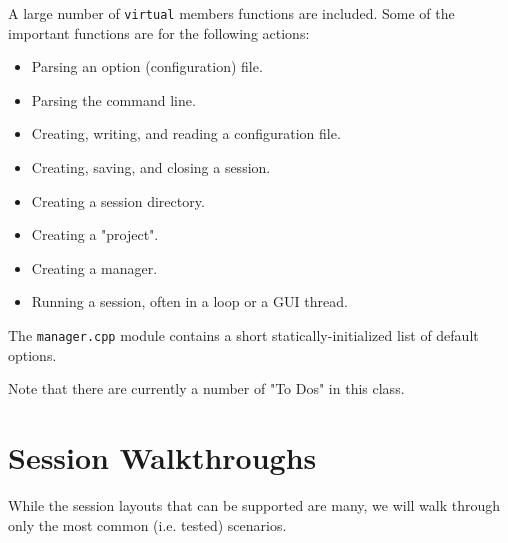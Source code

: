    A large number of \texttt{virtual} members functions are included.
   Some of the important functions are for the following actions:

   \begin{itemize}
      \item Parsing an option (configuration) file.
      \item Parsing the command line.
      \item Creating, writing, and reading a configuration file.
      \item Creating, saving, and closing a session.
      \item Creating a session directory.
      \item Creating a "project".
      \item Creating a manager.
      \item Running a session, often in a loop or a GUI thread.
   \end{itemize}
   
   The \texttt{manager.cpp} module contains a short
   statically-initialized list of
   default options.

   Note that there are currently a number of "To Dos" in this class.

\section{Session Walkthroughs}
\label{sec:session_walkthroughs}

	While the session layouts that can be supported are many, we will
	walk through only the most common (i.e. tested) scenarios.

